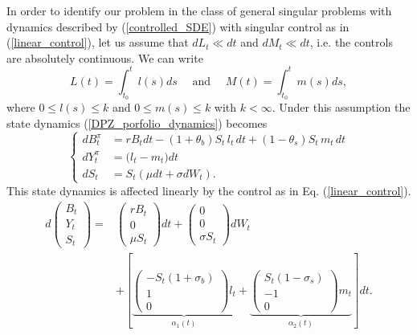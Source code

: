 In order to identify our problem in the class of general singular problems with dynamics described by (\ref{controlled_SDE}) with singular control as in (\ref{linear_control}), 
let us assume that 
$dL_t \ll dt$ and $dM_t \ll dt$, i.e. the controls are absolutely continuous. We can write
\begin{equation}\label{absolute_cont_controls}
 L(t) = \int_{t_0}^t l(s) ds \quad \mbox{ and } \quad M(t) = \int_{t_0}^t m(s) ds, 
\end{equation}
where $0 \leq l(s) \leq k$ and $0 \leq m(s) \leq k$ with $k<\infty$.
Under this assumption the state dynamics (\ref{DPZ_porfolio_dynamics}) becomes
\begin{equation}\label{DPZ_porfolio_dynamics2}
 \begin{cases}
 dB^{\pi}_t &=  rB_t dt - (1+\theta_b)S_t \,l_t \, dt + (1-\theta_s) S_t \, m_t\, dt \\
 dY^{\pi}_t &=  \bigl( l_t - m_t \bigr) dt \\
 dS_t &=  S_t \left( \mu dt + \sigma dW_t \right).
\end{cases}
\end{equation} 
This state dynamics is affected linearly by the control as in Eq. (\ref{linear_control}).
\begin{align}\label{DPZ_porfolio_dynamicsM2}
d \left(
\begin{array}{l}
B_t\\
Y_t\\
S_t
\end{array} \right)
  =&  \left( \begin{array}{l}
r B_t\\
0\\
\mu S_{t}
\end{array} \right)
dt +  \left( \begin{array}{l}
0\\
0\\
\sigma S_{t}
\end{array} \right) dW_t \\ \nonumber
&+ \left[ \underbrace{\left( \begin{array}{l}
-S_{t}(1+\sigma_b) \\
1\\
0
\end{array} \right)l_t}_{\alpha_1(t)}
+ \underbrace{\left( \begin{array}{l}
S_{t}(1-\sigma_s) \\
-1\\
0
\end{array} \right) m_t}_{\alpha_2(t)} \right] dt.
\end{align}
